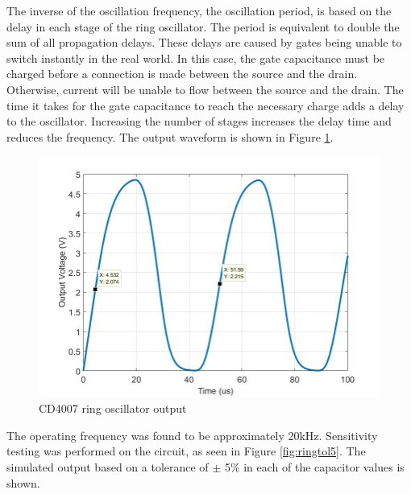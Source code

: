 The inverse of the oscillation frequency, the oscillation period, is based on the delay in each stage of the ring oscillator. The period is equivalent to double the sum of all propagation delays. These delays are caused by gates being unable to switch instantly in the real world. In this case, the gate capacitance must be charged before a connection is made between the source and the drain. Otherwise, current will be unable to flow between the source and the drain. The time it takes for the gate capacitance to reach the necessary charge adds a delay to the oscillator. Increasing the number of stages increases the delay time and reduces the frequency. The output waveform is shown in Figure \ref{fig:ringnotol}.

\begin{figure}[H]
    \centering
        \centering
        \includegraphics[scale = .35]{CircuitDevelopment/cd4007SIM/ring_output_notol.jpg}
        \caption{CD4007 ring oscillator output}
        \label{fig:ringnotol}
\end{figure}
The operating frequency was found to be approximately 20kHz. Sensitivity testing was performed on the circuit, as seen in Figure \ref{fig:ringtol5}. The simulated output based on a tolerance of $\pm$ 5\% in each of the capacitor values is shown.  \newline

